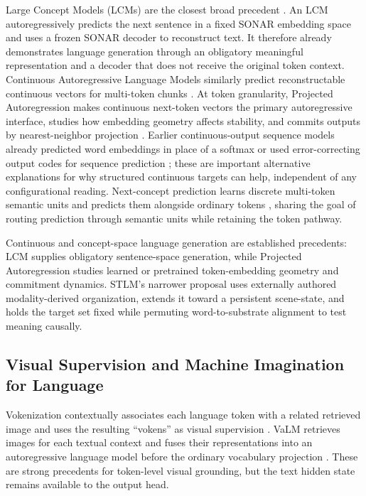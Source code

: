 \documentclass[11pt,a4paper]{article}
\begin{document}
Large Concept Models (LCMs) are the closest broad precedent \cite{lcm2024}. An LCM autoregressively predicts the next sentence in a fixed SONAR embedding space and uses a frozen SONAR decoder to reconstruct text. It therefore already demonstrates language generation through an obligatory meaningful representation and a decoder that does not receive the original token context. Continuous Autoregressive Language Models similarly predict reconstructable continuous vectors for multi-token chunks \cite{calm2025}. At token granularity, Projected Autoregression makes continuous next-token vectors the primary autoregressive interface, studies how embedding geometry affects stability, and commits outputs by nearest-neighbor projection \cite{projectedar2026}. Earlier continuous-output sequence models already predicted word embeddings in place of a softmax \cite{vmf2019} or used error-correcting output codes for sequence prediction \cite{ecoc2019}; these are important alternative explanations for why structured continuous targets can help, independent of any configurational reading. Next-concept prediction learns discrete multi-token semantic units and predicts them alongside ordinary tokens \cite{nextconcept2026}, sharing the goal of routing prediction through semantic units while retaining the token pathway.

Continuous and concept-space language generation are established precedents: LCM supplies obligatory sentence-space generation, while Projected Autoregression studies learned or pretrained token-embedding geometry and commitment dynamics. STLM's narrower proposal uses externally authored modality-derived organization, extends it toward a persistent scene-state, and holds the target set fixed while permuting word-to-substrate alignment to test meaning causally.

\subsection{Visual Supervision and Machine Imagination for Language}

Vokenization contextually associates each language token with a related retrieved image and uses the resulting ``vokens'' as visual supervision \cite{vokenization2020}. VaLM retrieves images for each textual context and fuses their representations into an autoregressive language model before the ordinary vocabulary projection \cite{valm2022}. These are strong precedents for token-level visual grounding, but the text hidden state remains available to the output head.
\end{document}
